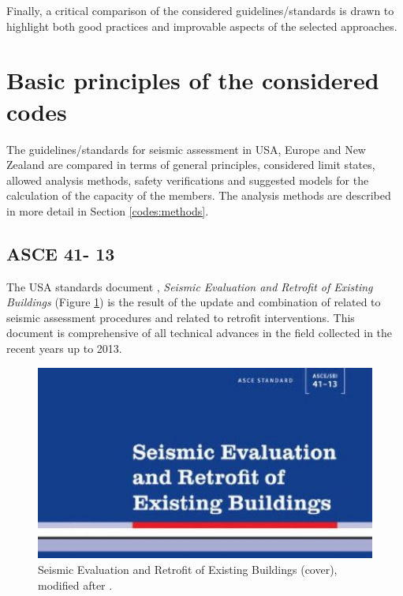 Finally, a critical comparison of the considered guidelines/standards is drawn to highlight both good practices and improvable aspects of the selected approaches.


\section{Basic principles of the considered codes}

The guidelines/standards for seismic assessment in USA, Europe and New Zealand are compared in terms of general principles, considered limit states, allowed analysis methods, safety verifications and suggested models for the calculation of the capacity of the members. The analysis methods are described in more detail in Section \ref{codes:methods}.


\subsection{ASCE 41- 13}

The USA standards document \cite{ASCE41}, \textit{Seismic Evaluation and Retrofit of Existing Buildings} (Figure \ref{fig:ASCEcover}) is the result of the update and combination of \cite{ASCE31} related to seismic assessment procedures and \cite{ASCE41-06} related to retrofit interventions. This document is comprehensive of all technical advances in the field collected in the recent years up to 2013.

\begin{figure}[h]
\begin{center}
    \includegraphics[width=1\textwidth]{./CHAP1/img/ASCEcover}
\caption{Seismic Evaluation and Retrofit of Existing Buildings (cover), modified after \cite{ASCE41}.}
\label{fig:ASCEcover}
\end{center}
\end{figure}


